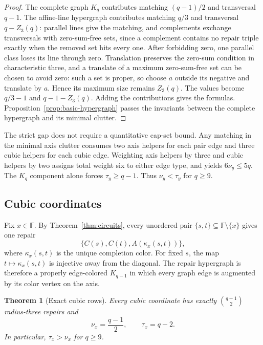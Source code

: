 \documentclass[11pt]{article}
\newtheorem{theorem}{Theorem}[section]
\theoremstyle{definition}
\theoremstyle{remark}
\newcommand{\F}{\mathbb{F}}
\begin{document}
\begin{proof}
The complete graph $K_q$ contributes matching $(q-1)/2$ and transversal
$q-1$.  The affine-line hypergraph contributes matching $q/3$ and
transversal $q-Z_3(q)$: parallel lines give the matching, and complements
exchange transversals with zero-sum-free sets, since a complement contains no
repair triple exactly when the removed set hits every one.  After forbidding
zero, one parallel class loses its line through zero.  Translation preserves
the zero-sum condition in characteristic three, and a translate of a maximum
zero-sum-free set can be chosen to avoid zero: such a set is proper, so choose
$a$ outside its negative and translate by $a$.  Hence its maximum size remains
$Z_3(q)$.  The values become $q/3-1$ and $q-1-Z_3(q)$.  Adding the
contributions gives the formulas.
Proposition~\ref{prop:basic-hypergraph} passes the invariants between the
complete hypergraph and its minimal clutter.
\end{proof}

The strict gap does not require a quantitative cap-set bound.  Any matching
in the minimal axis clutter consumes two axis helpers for each pair edge and
three cubic helpers for each cubic edge.  Weighting axis helpers by three and
cubic helpers by two assigns total weight six to either edge type, and yields
$6\nu_y\leq5q$.  The $K_q$ component alone forces
$\tau_y\geq q-1$.  Thus $\nu_y<\tau_y$ for $q\geq9$.

\subsection{Cubic coordinates}

Fix $x\in\F$.  By Theorem~\ref{thm:circuits}, every unordered pair
$\{s,t\}\subseteq\F\setminus\{x\}$ gives one repair
\[
 \{C(s),C(t),A(\kappa_x(s,t))\},
\]
where $\kappa_x(s,t)$ is the unique completion color.  For fixed $s$, the
map $t\mapsto\kappa_x(s,t)$ is injective away from the diagonal.  The repair
hypergraph is therefore a properly edge-colored $K_{q-1}$ in which every
graph edge is augmented by its color vertex on the axis.

\begin{theorem}[Exact cubic rows]\label{thm:cubic-rows}
Every cubic coordinate has exactly $\binom{q-1}{2}$ radius-three repairs and
\[
 \nu_x=\frac{q-1}{2},\qquad
 \tau_x=q-2.
\]
In particular, $\tau_x>\nu_x$ for $q\geq9$.
\end{theorem}
\end{document}
